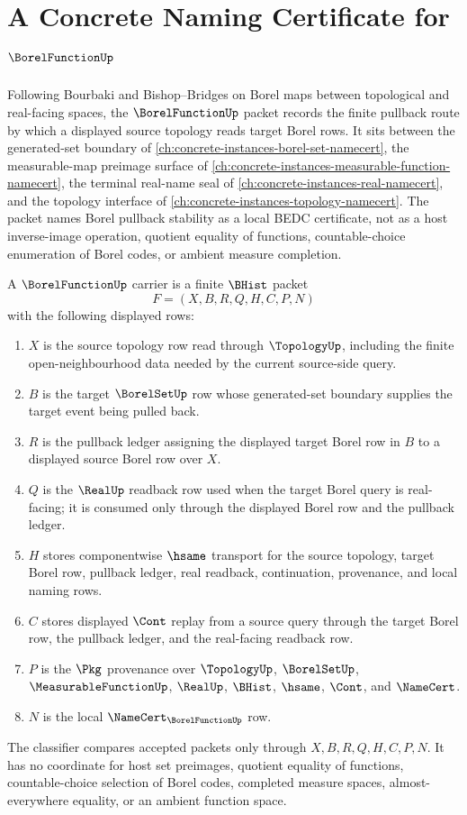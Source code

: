 \chapter{A Concrete Naming Certificate for $\BorelFunctionUp$}
\label{ch:concrete-instances-borel-function-namecert}

Following Bourbaki and Bishop--Bridges on Borel maps between topological and real-facing spaces, the $\BorelFunctionUp$ packet records the finite pullback route by which a displayed source topology reads target Borel rows. It sits between the generated-set boundary of \autoref{ch:concrete-instances-borel-set-namecert}, the measurable-map preimage surface of \autoref{ch:concrete-instances-measurable-function-namecert}, the terminal real-name seal of \autoref{ch:concrete-instances-real-namecert}, and the topology interface of \autoref{ch:concrete-instances-topology-namecert}. The packet names Borel pullback stability as a local BEDC certificate, not as a host inverse-image operation, quotient equality of functions, countable-choice enumeration of Borel codes, or ambient measure completion.

\begin{definition}
\label{def:borel-function-carrier}
A $\BorelFunctionUp$ carrier is a finite $\BHist$ packet
$$
F=(X,B,R,Q,H,C,P,N)
$$
with the following displayed rows:
\begin{enumerate}
\item $X$ is the source topology row read through $\TopologyUp$, including the finite open-neighbourhood data needed by the current source-side query.
\item $B$ is the target $\BorelSetUp$ row whose generated-set boundary supplies the target event being pulled back.
\item $R$ is the pullback ledger assigning the displayed target Borel row in $B$ to a displayed source Borel row over $X$.
\item $Q$ is the $\RealUp$ readback row used when the target Borel query is real-facing; it is consumed only through the displayed Borel row and the pullback ledger.
\item $H$ stores componentwise $\hsame$ transport for the source topology, target Borel row, pullback ledger, real readback, continuation, provenance, and local naming rows.
\item $C$ stores displayed $\Cont$ replay from a source query through the target Borel row, the pullback ledger, and the real-facing readback row.
\item $P$ is the $\Pkg$ provenance over $\TopologyUp$, $\BorelSetUp$, $\MeasurableFunctionUp$, $\RealUp$, $\BHist$, $\hsame$, $\Cont$, and $\NameCert$.
\item $N$ is the local $\NameCert_{\BorelFunctionUp}$ row.
\end{enumerate}
The classifier compares accepted packets only through $X,B,R,Q,H,C,P,N$. It has no coordinate for host set preimages, quotient equality of functions, countable-choice selection of Borel codes, completed measure spaces, almost-everywhere equality, or an ambient function space.
\end{definition}

